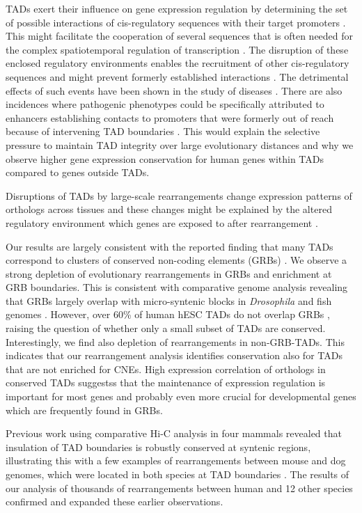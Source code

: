 \documentclass[a4paper,twoside=true,openright,parskip=full,chapterprefix=true,11pt,headings=normal,bibliography=totoc,listof=totoc,titlepage=on,captions=tableabove,draft=false]{scrreprt}
\theoremstyle{definition}
\theoremstyle{definition}
\theoremstyle{definition}
\theoremstyle{remark}
\begin{document}
TADs exert their influence on gene expression regulation by determining
the set of possible interactions of cis-regulatory sequences with their
target promoters \citep{Nora2012, Symmons2014, Schoenfelder2015}. This
might facilitate the cooperation of several sequences that is often
needed for the complex spatiotemporal regulation of transcription
\citep{Andrey2017}. The disruption of these enclosed regulatory
environments enables the recruitment of other cis-regulatory sequences
and might prevent formerly established interactions
\citep{Montavon2012}. The detrimental effects of such events have been
shown in the study of diseases \citep{Redin2016, Zepeda-Mendoza2017}.
There are also incidences where pathogenic phenotypes could be
specifically attributed to enhancers establishing contacts to promoters
that were formerly out of reach because of intervening TAD boundaries
\citep{Ibn-Salem2014, Lupianez2015, Spielmann2012}. This would explain
the selective pressure to maintain TAD integrity over large evolutionary
distances and why we observe higher gene expression conservation for
human genes within TADs compared to genes outside TADs.

Disruptions of TADs by large-scale rearrangements change expression
patterns of orthologs across tissues and these changes might be
explained by the altered regulatory environment which genes are exposed
to after rearrangement \citep{Farre2015}.

Our results are largely consistent with the reported finding that many
TADs correspond to clusters of conserved non-coding elements (GRBs)
\citep{Harmston2017}. We observe a strong depletion of evolutionary
rearrangements in GRBs and enrichment at GRB boundaries. This is
consistent with comparative genome analysis revealing that GRBs largely
overlap with micro-syntenic blocks in \emph{Drosophila}
\citep{Engstrom2007} and fish genomes \citep{Dimitrieva2013}. However,
over 60\% of human hESC TADs do not overlap GRBs \citep{Harmston2017},
raising the question of whether only a small subset of TADs are
conserved. Interestingly, we find also depletion of rearrangements in
non-GRB-TADs. This indicates that our rearrangement analysis identifies
conservation also for TADs that are not enriched for CNEs. High
expression correlation of orthologs in conserved TADs suggestss that the
maintenance of expression regulation is important for most genes and
probably even more crucial for developmental genes which are frequently
found in GRBs.

Previous work using comparative Hi-C analysis in four mammals revealed
that insulation of TAD boundaries is robustly conserved at syntenic
regions, illustrating this with a few examples of rearrangements between
mouse and dog genomes, which were located in both species at TAD
boundaries \citep{VietriRudan2015}. The results of our analysis of
thousands of rearrangements between human and 12 other species confirmed
and expanded these earlier observations.
\end{document}
